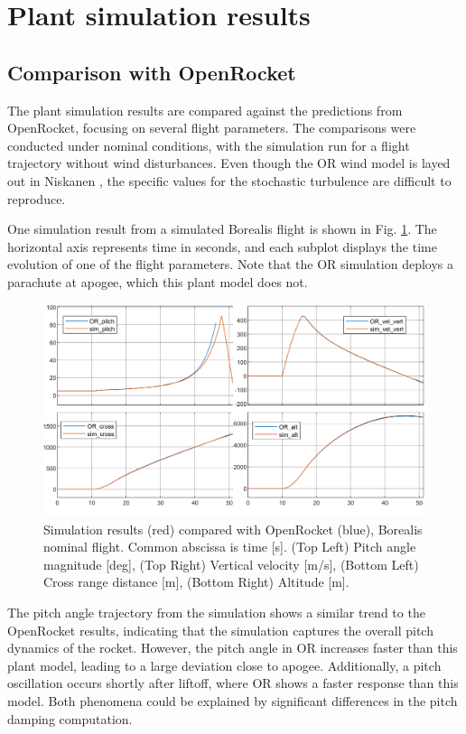 \section{Plant simulation results}

\subsection{Comparison with OpenRocket}

The plant simulation results are compared against the predictions from OpenRocket, focusing on several flight parameters. 
The comparisons were conducted under nominal conditions, with the simulation run for a flight trajectory without wind disturbances.
Even though the OR wind model is layed out in Niskanen \cite{niskanen2009}, the specific values for the stochastic turbulence are difficult to reproduce.

One simulation result from a simulated Borealis flight is shown in Fig. \ref{fig:result-or-comparison}. 
The horizontal axis represents time in seconds, and each subplot displays the time evolution of one of the flight parameters.
Note that the OR simulation deploys a parachute at apogee, which this plant model does not. 

\begin{figure}[ht]
    \centering
    \includegraphics[width=0.95\linewidth]{images-plant/simulation_compare-OR.png}
    \caption[Simulation compared with OpenRocket]{Simulation results (red) compared with OpenRocket (blue), Borealis nominal flight. Common abscissa is time [s]. (Top Left) Pitch angle magnitude [deg], (Top Right) Vertical velocity [m/s], (Bottom Left) Cross range distance [m], (Bottom Right) Altitude [m].}
    \label{fig:result-or-comparison}
\end{figure}

The pitch angle trajectory from the simulation shows a similar trend to the OpenRocket results, indicating that the simulation captures the overall pitch dynamics of the rocket. 
However, the pitch angle in OR increases faster than this plant model, leading to a large deviation close to apogee.
Additionally, a pitch oscillation occurs shortly after liftoff, where OR shows a faster response than this model.
Both phenomena could be explained by significant differences in the pitch damping computation.
    
